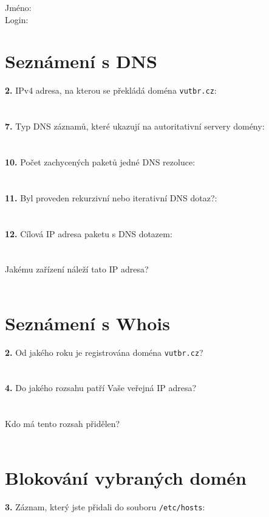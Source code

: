 Jméno:\\
Login:\\

\section{Seznámení s DNS}
\textbf{2.} IPv4 adresa, na kterou se překládá doména {\tt vutbr.cz}:\\
\\
\\
\textbf{7.} Typ DNS záznamů, které ukazují na autoritativní servery domény:\\
\\
\\
\textbf{10.} Počet zachycených paketů jedné DNS rezoluce: \\
\\
\\
\textbf{11.} Byl proveden rekurzivní nebo iterativní DNS dotaz?:\\
\\
\\
\textbf{12.} Cílová IP adresa paketu s DNS dotazem:\\
\\
\\
Jakému zařízení náleží tato IP adresa?\\
\\


\section{Seznámení s Whois}
\textbf{2.} Od jakého roku je registrována doména {\tt vutbr.cz}?\\
\\
\\
\textbf{4.} Do jakého rozsahu patří Vaše veřejná IP adresa?\\
\\
\\
Kdo má tento rozsah přidělen?\\
\\


\section{Blokování vybraných domén}

\textbf{3.} Záznam, který jste přidali do souboru {\tt /etc/hosts}:\\
\\
\\

